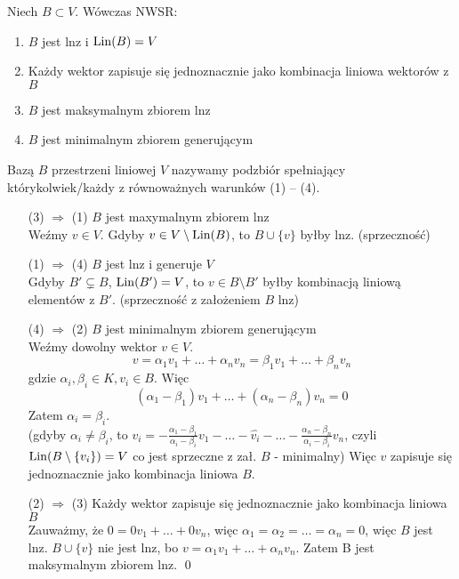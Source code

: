 \begin{tw}
  Niech $ B \subset V $. Wówczas NWSR:
  \begin{enumerate}[{(}1{)}]
    \item $ B $ jest lnz i $ \operatorname{Lin}(B) = V $
    \item Każdy wektor zapisuje się jednoznacznie jako kombinacja liniowa wektorów z $ B $
    \item $ B $ jest maksymalnym zbiorem lnz
    \item $ B $ jest minimalnym zbiorem generującym
  \end{enumerate}
\end{tw}

\begin{df}
    Bazą $ B $  przestrzeni liniowej $ V $ nazywamy podzbiór spełniający którykolwiek/każdy z równoważnych warunków (1) -- (4).
\end{df}

\begin{dd} \hfill
    \begin{itemize}
        \item[ (3) $\Rightarrow$ (1) ] $ B $ jest maxymalnym zbiorem lnz\\
            Weźmy $ v \in V $. Gdyby $ v \in V \setminus \operatorname{Lin}(B)$, to $ B \cup \{v\}$ byłby lnz. (sprzeczność)
        \item[(1) $\Rightarrow$ (4)] $ B $ jest lnz i generuje $ V $\\
            Gdyby $ B' \subsetneq B$, $ \operatorname{Lin}(B') = V $, to $ v \in B \setminus B'$ byłby kombinacją liniową elementów z $ B'$. (sprzeczność z założeniem $B$ lnz)
        \item[(4) $\Rightarrow$ (2)] $ B $ jest minimalnym zbiorem generującym\\
            Weźmy dowolny wektor $ v \in V $.
            $$ v = \alpha_1v_1 + \dots + \alpha_nv_n = \beta_1v_1 + \dots + \beta_nv_n$$
            gdzie $ \alpha_i, \beta_i \in K, v_i \in B$. Więc
            $$ (\alpha_1 - \beta_1)v_1 + \dots + (\alpha_n - \beta_n)v_n = 0 $$
            Zatem $ \alpha_i = \beta_i $. \\
            (gdyby $ \alpha_i \neq \beta_i $, to $ v_i = -\frac{\alpha_1 - \beta_1}{\alpha_i - \beta_i}v_1 - \dots - \hat{v_i} - \dots -\frac{\alpha_n - \beta_n}{\alpha_i - \beta_i}v_n $,
            czyli $ \operatorname{Lin}(B \setminus \{v_i\}) = V $ co jest sprzeczne z zał. $ B $ - minimalny)
            Więc $ v $ zapisuje się jednoznacznie jako kombinacja liniowa $ B $.
        \item[(2) $\Rightarrow$ (3)] Każdy wektor zapisuje się jednoznacznie jako kombinacja liniowa $ B $\\
            Zauważmy, że $ 0 = 0 v_1 + \dots + 0 v_n $, więc $ \alpha_1 = \alpha_2 = \dots = \alpha_n = 0 $, więc $ B $ jest lnz.
            $ B \cup \{v\} $ nie jest lnz, bo $ v = \alpha_1v_1 + \dots + \alpha_nv_n$. Zatem B jest maksymalnym zbiorem lnz. \qed

    \end{itemize}
\end{dd}



